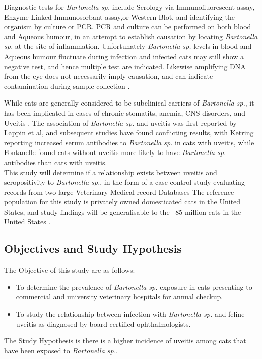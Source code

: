 \documentclass[11pt,twocolumn]{article}
\begin{document}
		Diagnostic tests for \emph{Bartonella sp.} include Serology via Immunofluorescent assay, Enzyme Linked Immunosorbant assay,or Western Blot, and identifying the organism by culture or PCR.
		PCR and culture can be performed on both blood and Aqueous humour, in an attempt to establish causation by locating \emph{Bartonella sp.} at the site of inflammation. Unfortunately \emph{Bartonella sp.} levels in blood and Aqueous humour fluctuate during infection and infected cats may still show a negative test, and hence multiple test are indicated\cite{Guptill2010}. Likewise amplifying DNA from the eye does not necessarily imply causation, and can indicate contamination during sample collection \cite{Powell2010}.


		While cats are generally considered to be subclinical carriers of \emph{Bartonella sp.}, it has been implicated in cases of chronic stomatits, anemia, CNS disorders, and Uveitis \cite{Nasir2005}.
		The association of \emph{Bartonella sp.} and uveitis was first reported by Lappin et al\cite{Lappin1999}, and subsequent studies have found conflicting results, with Ketring reporting increased serum antibodies to \emph{Bartonella sp.} in cats with uveitis\cite{Ketring2004}, while Fontanelle found cats without uveitis more likely to have \emph{Bartonella sp.} antibodies than cats with uveitis.\\
		

		This study will determine if a relationship exists between uveitis and seropositivity to  \emph{Bartonella sp.}, in the form of a case control study evaluating records from two large Veterinary Medical record Databases \cite{bark12,UniversityVeterinary}	
		The reference population for this study is privately owned domesticated cats in the United States, and study findings will be generalisable to the ~85 million cats in the United States \cite{HSUSown}.

		\subsection{Objectives and Study Hypothesis}
			The Objective of this study are as follows: 
				\begin{itemize}
					\item To determine the prevalence of \emph{Bartonella sp.} exposure in cats presenting to commercial and university veterinary hospitals for annual checkup.
					\item To study the relationship between infection with \emph{Bartonella sp.} and feline uveitis as diagnosed by board certified ophthalmologists.
				\end{itemize}
			The Study Hypothesis is there is a higher incidence of uveitis among cats that have been exposed to \emph{Bartonella sp.}.
\end{document}
